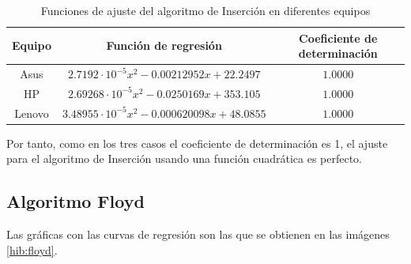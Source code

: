 \documentclass{homework}
\begin{document}
    \begin{table}[H]
        \centering
        \begin{tabular}{|c|c|c|}
            \hline
            Equipo & Función de regresión & Coeficiente de determinación \\
            \hline
            Asus & $2.7192 \cdot 10^{-5} x^2 - 0.00212952 x + 22.2497$ & $1.0000$ \\
            HP & $2.69268 \cdot 10^{-5} x^2 - 0.0250169 x + 353.105$ &  $1.0000$ \\
            Lenovo & $3.48955 \cdot 10^{-5} x^{2} - 0.000620098 x + 48.0855$ & $1.0000$ \\
            \hline
        \end{tabular}
        \caption{Funciones de ajuste del algoritmo de Inserción en diferentes equipos}
        \label{insercion:tab}
    \end{table} 

    Por tanto, como en los tres casos el coeficiente de determinación es 1, el ajuste para el algoritmo de Inserción 
    usando una función cuadrática es perfecto.

    \subsection{Algoritmo Floyd}

    Las gráficas con las curvas de regresión son las que se obtienen en las imágenes \ref{hib:floyd}.
\end{document}
